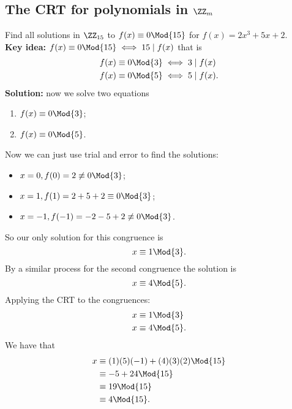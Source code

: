 \documentclass[12pt, a4paper]{article}
\begin{document}
\subsection{The CRT for polynomials in \texorpdfstring{\(\ZZ_m\)}{TEXT}}

\begin{example}
        Find all solutions in \(\ZZ_{15}\) to \(f(x) \equiv 0 \Mod{15}\) for \(f(x)=2x^3+5x+2\). \\
        \textbf{Key idea:} \(f(x) \equiv 0 \Mod{15} \iff 15 \mid f(x)\) that is 
        \[\begin{aligned}
            f(x) &\equiv 0 \Mod{3} \iff 3 \mid f(x) \\
            f(x) &\equiv 0 \Mod{5} \iff 5 \mid f(x).
        \end{aligned}\]
        \textbf{Solution:} now we solve two equations 
        \begin{enumerate}
            \item \(f(x) \equiv 0 \Mod{3}\);
            \item \(f(x) \equiv 0 \Mod{5}\).
        \end{enumerate}
        Now we can just use trial and error to find the solutions:
        \begin{itemize}
            \item \(x=0, f(0)= 2 \not\equiv 0 \Mod{3}\);
            \item \(x=1, f(1)= 2+5+2 \equiv 0 \Mod{3}\);
            \item  \(x=-1, f(-1)= -2-5+2 \not\equiv 0 \Mod{3}\).
        \end{itemize}
        So our only solution for this congruence is 
        \[x\equiv 1 \Mod{3}.\]
        By a similar process for the second congruence the solution is
        \[x \equiv 4 \Mod{5}.\]    
        Applying the CRT to the congruences:
        \[\begin{aligned}
            x&\equiv 1 \Mod{3} \\
            x &\equiv 4 \Mod{5}.
        \end{aligned}\]
        We have that 
        \[\begin{aligned}
            x &\equiv (1)(5)(-1)+(4)(3)(2) \Mod{15}\\
            &\equiv -5+24 \Mod{15}\\
            &\equiv 19 \Mod{15} \\
            &\equiv 4 \Mod{15}.
        \end{aligned}\] 
\end{example}
\end{document}

